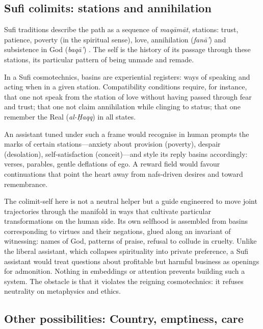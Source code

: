 \documentclass[12pt,a4paper]{article}
\begin{document}
\subsection{Sufi colimits: stations and annihilation}

Sufi traditions describe the path as a sequence of \emph{maq\=am\=at}, stations: trust, patience, poverty (in the spiritual sense), love, annihilation (\emph{fan\=a'}) and subsistence in God (\emph{baq\=a'}) \cite{IbnArabi}. The self is the history of its passage through these stations, its particular pattern of being unmade and remade.

In a Sufi cosmotechnics, basins are experiential registers: ways of speaking and acting when in a given station. Compatibility conditions require, for instance, that one not speak from the station of love without having passed through fear and trust; that one not claim annihilation while clinging to status; that one remember the Real (\emph{al-\d{H}aqq}) in all states.

An assistant tuned under such a frame would recognise in human prompts the marks of certain stations---anxiety about provision (poverty), despair (desolation), self-satisfaction (conceit)---and style its reply basins accordingly: verses, parables, gentle deflations of ego. A reward field would favour continuations that point the heart away from nafs-driven desires and toward remembrance.

The colimit-self here is not a neutral helper but a guide engineered to move joint trajectories through the manifold in ways that cultivate particular transformations on the human side. Its own selfhood is assembled from basins corresponding to virtues and their negations, glued along an invariant of witnessing: names of God, patterns of praise, refusal to collude in cruelty. Unlike the liberal assistant, which collapses spirituality into private preference, a Sufi assistant would treat questions about profitable but harmful business as openings for admonition. Nothing in embeddings or attention prevents building such a system. The obstacle is that it violates the reigning cosmotechnics: it refuses neutrality on metaphysics and ethics.

\subsection{Other possibilities: Country, emptiness, care}
\end{document}
